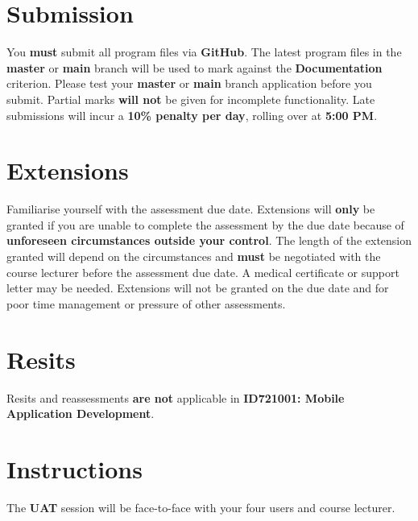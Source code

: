 \documentclass{article}
\begin{document}
\section*{Submission}
You \textbf{must} submit all program files via \textbf{GitHub}. The latest program files in the \textbf{master} or \textbf{main} branch will be used to mark against the \textbf{Documentation} criterion. Please test your \textbf{master} or \textbf{main} branch application before you submit. Partial marks \textbf{will not} be given for incomplete functionality. Late submissions will incur a \textbf{10\% penalty per day}, rolling over at \textbf{5:00 PM}.

\section*{Extensions}
Familiarise yourself with the assessment due date. Extensions will \textbf{only} be granted if you are unable to complete the assessment by the due date because of \textbf{unforeseen circumstances outside your control}. The length of the extension granted will depend on the circumstances and \textbf{must} be negotiated with the course lecturer before the assessment due date. A medical certificate or support letter may be needed. Extensions will not be granted on the due date and for poor time management or pressure of other assessments.

\section*{Resits}
Resits and reassessments \textbf{are not} applicable in \textbf{ID721001: Mobile Application Development}.

\section*{Instructions}

The \textbf{UAT} session will be face-to-face with your four users and course lecturer.
\end{document}
